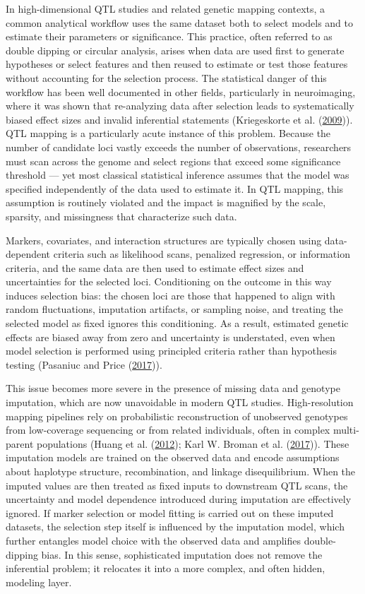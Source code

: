 \documentclass[
  12pt,
]{article}
\begin{document}
In high-dimensional QTL studies and related genetic mapping contexts, a common analytical workflow uses the same dataset both to select models and to estimate their parameters or significance. This practice, often referred to as double dipping or circular analysis, arises when data are used first to generate hypotheses or select features and then reused to estimate or test those features without accounting for the selection process. The statistical danger of this workflow has been well documented in other fields, particularly in neuroimaging, where it was shown that re-analyzing data after selection leads to systematically biased effect sizes and invalid inferential statements (Kriegeskorte et al. (\protect\hyperlink{ref-Kriegeskorte2009}{2009})). QTL mapping is a particularly acute instance of this problem. Because the number of candidate loci vastly exceeds the number of observations, researchers must scan across the genome and select regions that exceed some significance threshold — yet most classical statistical inference assumes that the model was specified independently of the data used to estimate it. In QTL mapping, this assumption is routinely violated and the impact is magnified by the scale, sparsity, and missingness that characterize such data.

Markers, covariates, and interaction structures are typically chosen
using data-dependent criteria such as likelihood scans, penalized
regression, or information criteria, and the same data are then used to
estimate effect sizes and uncertainties for the selected loci.
Conditioning on the outcome in this way induces selection bias: the
chosen loci are those that happened to align with random fluctuations,
imputation artifacts, or sampling noise, and treating the selected model
as fixed ignores this conditioning. As a result, estimated genetic
effects are biased away from zero and uncertainty is understated, even
when model selection is performed using principled criteria rather than
hypothesis testing (Pasaniuc and Price
(\protect\hyperlink{ref-Pasaniuc2017}{2017})).

This issue becomes more severe in the presence of missing data and
genotype imputation, which are now unavoidable in modern QTL studies.
High-resolution mapping pipelines rely on probabilistic reconstruction
of unobserved genotypes from low-coverage sequencing or from related
individuals, often in complex multi-parent populations (Huang et al.
(\protect\hyperlink{ref-Huang2012}{2012}); Karl W. Broman et al.
(\protect\hyperlink{ref-Broman2017}{2017})). These imputation models are
trained on the observed data and encode assumptions about haplotype
structure, recombination, and linkage disequilibrium. When the imputed
values are then treated as fixed inputs to downstream QTL scans, the
uncertainty and model dependence introduced during imputation are
effectively ignored. If marker selection or model fitting is carried out
on these imputed datasets, the selection step itself is influenced by
the imputation model, which further entangles model choice with the
observed data and amplifies double-dipping bias. In this sense,
sophisticated imputation does not remove the inferential problem; it
relocates it into a more complex, and often hidden, modeling layer.
\end{document}
